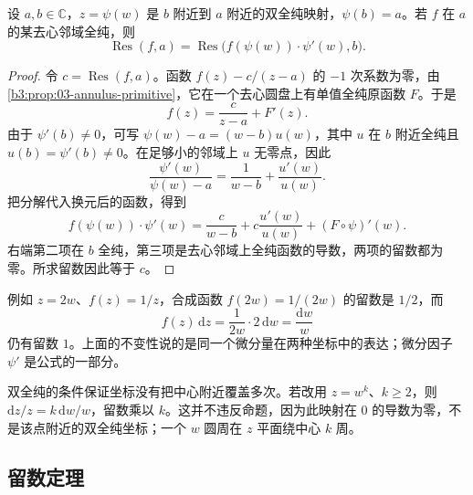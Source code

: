 \begin{proposition}[留数的坐标不变性]\label{b3:prop:03-residue-coordinate}
设 \(a,b\in\mathbb C\)，\(z=\psi(w)\) 是 \(b\) 附近到 \(a\) 附近的双全纯映射，\(\psi(b)=a\)。若 \(f\) 在 \(a\) 的某去心邻域全纯，则
\[
 \operatorname{Res}(f,a)=\operatorname{Res}\bigl(f(\psi(w))\cdot\psi'(w),b\bigr).
\]
\end{proposition}
\begin{proof}
令 \(c=\operatorname{Res}(f,a)\)。函数 \(f(z)-c/(z-a)\) 的 \(-1\) 次系数为零，由\cref{b3:prop:03-annulus-primitive}，它在一个去心圆盘上有单值全纯原函数 \(F\)。于是
\[
 f(z)=\frac{c}{z-a}+F'(z).
\]
由于 \(\psi'(b)\ne0\)，可写 \(\psi(w)-a=(w-b)u(w)\)，其中 \(u\) 在 \(b\) 附近全纯且 \(u(b)=\psi'(b)\ne0\)。在足够小的邻域上 \(u\) 无零点，因此
\[
 \frac{\psi'(w)}{\psi(w)-a}=\frac1{w-b}+\frac{u'(w)}{u(w)}.
\]
把分解代入换元后的函数，得到
\[
 f(\psi(w))\cdot\psi'(w)
 =\frac{c}{w-b}+c\frac{u'(w)}{u(w)}
   +(F\circ\psi)'(w).
\]
右端第二项在 \(b\) 全纯，第三项是去心邻域上全纯函数的导数，两项的留数都为零。所求留数因此等于 \(c\)。
\end{proof}
例如 \(z=2w\)、\(f(z)=1/z\)，合成函数 \(f(2w)=1/(2w)\) 的留数是 \(1/2\)，而
\[
 f(z)\,\mathrm{d}z=\frac1{2w}\cdot2\,\mathrm{d}w=\frac{\mathrm{d}w}{w}
\]
仍有留数 \(1\)。上面的不变性说的是同一个微分量在两种坐标中的表达；微分因子 \(\psi'\) 是公式的一部分。

\ProseParagraphBreak

双全纯的条件保证坐标没有把中心附近覆盖多次。若改用 \(z=w^k\)、\(k\ge2\)，则 \(\mathrm{d}z/z=k\,\mathrm{d}w/w\)，留数乘以 \(k\)。这并不违反命题，因为此映射在 \(0\) 的导数为零，不是该点附近的双全纯坐标；一个 \(w\) 圆周在 \(z\) 平面绕中心 \(k\) 周。

\subsection{留数定理}
\label{b3:subsec:030302}

